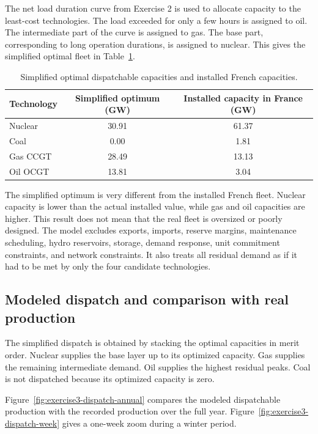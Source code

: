 \documentclass[a4paper]{report}
\begin{document}
The net load duration curve from Exercise 2 is used to allocate capacity to the least-cost technologies. The load exceeded for only a few hours is assigned to oil. The intermediate part of the curve is assigned to gas. The base part, corresponding to long operation durations, is assigned to nuclear. This gives the simplified optimal fleet in Table~\ref{tab:exercise3-capacity-comparison}.

\begin{table}[H]
  \centering
  \caption{Simplified optimal dispatchable capacities and installed French capacities.}
  \label{tab:exercise3-capacity-comparison}
  \begin{tabular}{lcc}
    \toprule
    Technology & Simplified optimum (GW) & Installed capacity in France (GW) \\
    \midrule
    Nuclear & 30.91 & 61.37 \\
    Coal & 0.00 & 1.81 \\
    Gas CCGT & 28.49 & 13.13 \\
    Oil OCGT & 13.81 & 3.04 \\
    \bottomrule
  \end{tabular}
\end{table}

The simplified optimum is very different from the installed French fleet. Nuclear capacity is lower than the actual installed value, while gas and oil capacities are higher. This result does not mean that the real fleet is oversized or poorly designed. The model excludes exports, imports, reserve margins, maintenance scheduling, hydro reservoirs, storage, demand response, unit commitment constraints, and network constraints. It also treats all residual demand as if it had to be met by only the four candidate technologies.

\subsection{Modeled dispatch and comparison with real production}

The simplified dispatch is obtained by stacking the optimal capacities in merit order. Nuclear supplies the base layer up to its optimized capacity. Gas supplies the remaining intermediate demand. Oil supplies the highest residual peaks. Coal is not dispatched because its optimized capacity is zero.

Figure~\ref{fig:exercise3-dispatch-annual} compares the modeled dispatchable production with the recorded production over the full year. Figure~\ref{fig:exercise3-dispatch-week} gives a one-week zoom during a winter period.
\end{document}
